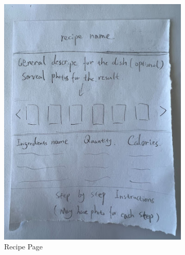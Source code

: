\documentclass[11pt,english]{article}
\begin{document}
\begin{figure}
\begin{subfigure}[b]{0.4\linewidth}
    \includegraphics[width=\linewidth]{figure3v2.jpg}
    \caption{Recipe Page}
  \end{subfigure}
    \begin{subfigure}[b]{0.4\linewidth}

\end{subfigure}
\end{figure}
\end{document}
